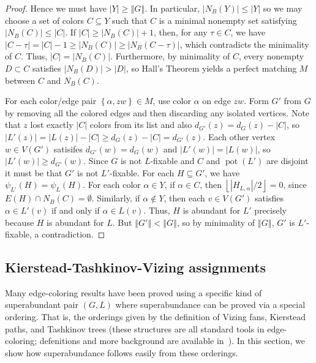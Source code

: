 \documentclass[12pt]{article}
\theoremstyle{plain}
\theoremstyle{definition}
\theoremstyle{remark}
\newcommand{\set}[1]{\left\{ #1 \right\}}
\newcommand{\card}[1]{\left|#1\right|}
\newcommand{\size}[1]{\left\Vert#1\right\Vert}
\newcommand{\floor}[1]{\left\lfloor#1\right\rfloor}
\newcommand{\pot}{\operatorname{pot}}
\begin{document}
\begin{proof}
Hence we must have $|Y| \ge \size{G}$.  In particular, $\card{N_B(Y)} \le |Y|$
so we may choose a set of colors $C \subseteq Y$ such that $C$ is a minimal
nonempty set satisfying $\card{N_B(C)} \le \card{C}$. 
If $|C|\ge |N_B(C)|+1$, then, for any $\tau\in C$, we have
$\card{C-\tau}=\card{C}-1\ge\card{N_B(C)}\ge\card{N_B(C-\tau)}$, which
contradicts the minimality of $C$.  Thus, $\card{C}=\card{N_B(C)}$.
Furthermore, by minimality of $C$, every nonempty $D\subset C$ satisfies
$\card{N_B(D)}>\card{D}$, so Hall's Theorem yields a perfect matching $M$ between $C$
and $N_B(C)$.

For each color/edge pair
$\set{\alpha, zw} \in M$, use color $\alpha$ on edge $zw$.  Form $G'$ from $G$
by removing all the colored edges and then discarding any isolated vertices.
Note that $z$ lost exactly $\card{C}$ colors from its list and also
$d_{G'}(z)=d_G(z)-\card{C}$, so $\card{L'(z)}=\card{L(z)}-\card{C}\ge
d_G(z)-\card{C}=d_{G'}(z)$.  Each other vertex $w\in V(G')$ satisifes
$d_{G'}(w)=d_G(w)$ and $\card{L'(w)}=\card{L(w)}$, so $\card{L'(w)}\ge
d_{G'}(w)$.
Since $G$ is not $L$-fixable and $C$ and $\pot(L')$ are disjoint it must be
that $G'$ is not $L'$-fixable.  
For each $H \subseteq G'$, we have $\psi_{L'}(H) = \psi_{L}(H)$.
For each color $\alpha\in Y$, if $\alpha\in C$, then
$\floor{\card{H_{L,\alpha}}/2}=0$, since $E(H)\cap N_B(C)=\emptyset$.
Similarly, if $\alpha\notin Y$, then each $v\in V(G')$ satisfies $\alpha\in
L'(v)$ if and only if $\alpha\in L(v)$.
Thus, $H$ is abundant for $L'$ precisely because $H$ is abundant for $L$.
But $\size{G'} < \size{G}$, so by minimality of $\size{G}$, $G'$ is
$L'$-fixable, a contradiction.
\end{proof}

\subsection{Kierstead-Tashkinov-Vizing assignments}
Many edge-coloring results have been proved using a specific kind of
superabundant pair $(G, L)$ where superabundance can be proved via a special
ordering. That is, the orderings given by the definition of Vizing fans,
Kierstead paths, and Tashkinov trees (these structures are all standard tools in
edge-coloring; defenitions and more background are available
in~\cite{stiebitz2012book}).
In this section, we show how superabundance follows easily from these orderings.
\end{document}
